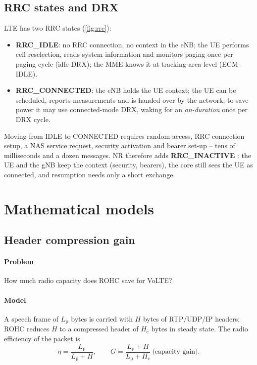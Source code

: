 \documentclass[11pt,a4paper]{article}
\begin{document}
\subsection{RRC states and DRX}
LTE has two RRC states (\cref{fig:rrc}):
\begin{itemize}
  \item \textbf{RRC\_IDLE}: no RRC connection, no context in the eNB; the UE performs cell
        reselection, reads system information and monitors paging once per paging cycle (idle DRX);
        the MME knows it at tracking-area level (ECM-IDLE).
  \item \textbf{RRC\_CONNECTED}: the eNB holds the UE context; the UE can be scheduled, reports
        measurements and is handed over by the network; to save power it may use connected-mode
        DRX, waking for an \emph{on-duration} once per DRX cycle.
\end{itemize}
Moving from IDLE to CONNECTED requires random access, RRC connection setup, a NAS service request,
security activation and bearer set-up -- tens of milliseconds and a dozen messages. NR therefore
adds \textbf{RRC\_INACTIVE} \cite{ts38331}: the UE and the gNB keep the context (security,
bearers), the core still sees the UE as connected, and resumption needs only a short exchange.

\begin{acnfigure}
  \caption{RRC state machine. LTE has IDLE and CONNECTED; NR adds INACTIVE, in which the context is
  suspended rather than released.}
  \label{fig:rrc}
\end{acnfigure}

\section{Mathematical models}

\subsection{Header compression gain}\label{sec:rohc}
\paragraph{Problem} How much radio capacity does ROHC save for VoLTE?
\paragraph{Model} A speech frame of $L_\mathrm{p}$ bytes is carried with $H$ bytes of RTP/UDP/IP
headers; ROHC reduces $H$ to a compressed header of $H_\mathrm{c}$ bytes in steady state. The
radio efficiency of the packet is
\begin{equation}\label{eq:rohc}
  \eta = \frac{L_\mathrm{p}}{L_\mathrm{p} + H}, \qquad
  G = \frac{L_\mathrm{p}+H}{L_\mathrm{p}+H_\mathrm{c}} \ \text{(capacity gain)}.
\end{equation}
\end{document}

